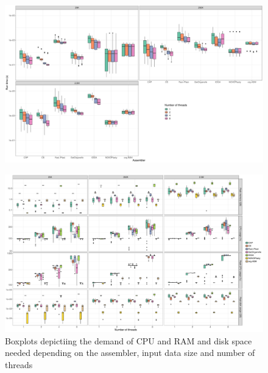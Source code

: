 \documentclass{bmcart}
\begin{document}
\begin{backmatter}
\begin{figure}[h!]
  \includegraphics[width=\textwidth]{plots/comp_time_log.pdf}
  \caption{
  }
        \label{fig:performance_runtime}
      \end{figure}

\begin{figure}[h!]
  \includegraphics[width=\textwidth]{plots/usage_amount_threads.pdf}
  \caption{
      Boxplots depictiing the demand of CPU and RAM and disk space needed depending on the assembler, input data size and number of threads}
      \label{fig:performance_memory_cpu}
      \end{figure}


\end{backmatter}
\end{document}
